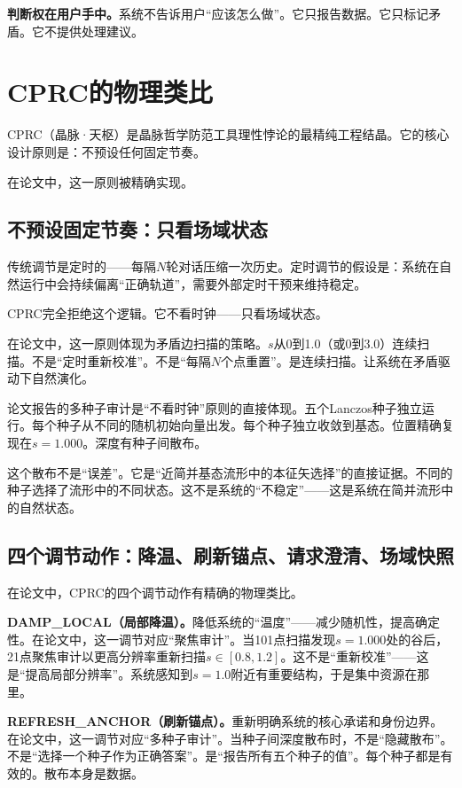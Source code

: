 \documentclass[11pt,a4paper]{book}
\theoremstyle{definition}
\begin{document}
\textbf{判断权在用户手中。}系统不告诉用户“应该怎么做”。它只报告数据。它只标记矛盾。它不提供处理建议。

\section{CPRC的物理类比}

CPRC（晶脉·天枢）是晶脉哲学防范工具理性悖论的最精纯工程结晶。它的核心设计原则是：不预设任何固定节奏。

在论文中，这一原则被精确实现。

\subsection{不预设固定节奏：只看场域状态}

传统调节是定时的——每隔$N$轮对话压缩一次历史。定时调节的假设是：系统在自然运行中会持续偏离“正确轨道”，需要外部定时干预来维持稳定。

CPRC完全拒绝这个逻辑。它不看时钟——只看场域状态。

在论文中，这一原则体现为矛盾边扫描的策略。$s$从0到1.0（或0到3.0）连续扫描。不是“定时重新校准”。不是“每隔$N$个点重置”。是连续扫描。让系统在矛盾驱动下自然演化。

论文报告的多种子审计是“不看时钟”原则的直接体现。五个Lanczos种子独立运行。每个种子从不同的随机初始向量出发。每个种子独立收敛到基态。位置精确复现在$s=1.000$。深度有种子间散布。

这个散布不是“误差”。它是“近简并基态流形中的本征矢选择”的直接证据。不同的种子选择了流形中的不同状态。这不是系统的“不稳定”——这是系统在简并流形中的自然状态。

\subsection{四个调节动作：降温、刷新锚点、请求澄清、场域快照}

在论文中，CPRC的四个调节动作有精确的物理类比。

\textbf{DAMP\_LOCAL（局部降温）。}降低系统的“温度”——减少随机性，提高确定性。在论文中，这一调节对应“聚焦审计”。当101点扫描发现$s=1.000$处的谷后，21点聚焦审计以更高分辨率重新扫描$s\in[0.8,1.2]$。这不是“重新校准”——这是“提高局部分辨率”。系统感知到$s=1.0$附近有重要结构，于是集中资源在那里。

\textbf{REFRESH\_ANCHOR（刷新锚点）。}重新明确系统的核心承诺和身份边界。在论文中，这一调节对应“多种子审计”。当种子间深度散布时，不是“隐藏散布”。不是“选择一个种子作为正确答案”。是“报告所有五个种子的值”。每个种子都是有效的。散布本身是数据。
\end{document}
